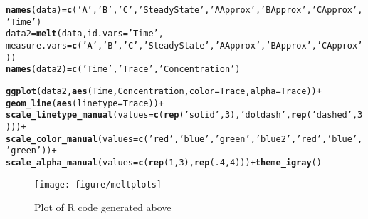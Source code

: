 \documentclass[10pt]{article}\usepackage{graphicx, color}
\makeatletter
\def\maxwidth{ %
  \ifdim\Gin@nat@width>\linewidth
    \linewidth
  \else
    \Gin@nat@width
  \fi
}
\newcommand{\hlfunctioncall}[1]{\textcolor[rgb]{0.501960784313725,0,0.329411764705882}{\textbf{#1}}}%
\newcommand{\hlstring}[1]{\textcolor[rgb]{0.6,0.6,1}{#1}}%
\newenvironment{kframe}{%
 \def\at@end@of@kframe{}%
 \ifinner\ifhmode%
  \def\at@end@of@kframe{\end{minipage}}%
  \begin{minipage}{\columnwidth}%
 \fi\fi%
 \def\FrameCommand##1{\hskip\@totalleftmargin \hskip-\fboxsep
 \colorbox{shadecolor}{##1}\hskip-\fboxsep
     \hskip-\linewidth \hskip-\@totalleftmargin \hskip\columnwidth}%
 \MakeFramed {\advance\hsize-\width
   \@totalleftmargin\z@ \linewidth\hsize
   \@setminipage}}%
 {\par\unskip\endMakeFramed%
 \at@end@of@kframe}
\newenvironment{knitrout}{}{} %
\makeatother
\begin{document}
\begin{knitrout}
\color{fgcolor}\begin{kframe}
\begin{alltt}
\hlfunctioncall{names}(data)=\hlfunctioncall{c}(\hlstring{'A'},\hlstring{'B'},\hlstring{'C'},\hlstring{'Steady State'},\hlstring{'A Approx'},\hlstring{'B Approx'},\hlstring{'C Approx'},\hlstring{'Time'})
data2=\hlfunctioncall{melt}(data,id.vars=\hlstring{'Time'},
           measure.vars=\hlfunctioncall{c}(\hlstring{'A'},\hlstring{'B'},\hlstring{'C'},\hlstring{'Steady State'},\hlstring{'A Approx'},\hlstring{'B Approx'},\hlstring{'C Approx'}))
\hlfunctioncall{names}(data2)=\hlfunctioncall{c}(\hlstring{'Time'},\hlstring{'Trace'},\hlstring{'Concentration'})
\end{alltt}
\end{kframe}
\end{knitrout}



\begin{knitrout}
\color{fgcolor}\begin{kframe}
\begin{alltt}
\hlfunctioncall{ggplot}(data2,\hlfunctioncall{aes}(Time,Concentration,color=Trace,alpha=Trace))+
  \hlfunctioncall{geom_line}(\hlfunctioncall{aes}(linetype=Trace))+
  \hlfunctioncall{scale_linetype_manual}(values=\hlfunctioncall{c}(\hlfunctioncall{rep}(\hlstring{'solid'},3),\hlstring{'dotdash'},\hlfunctioncall{rep}(\hlstring{'dashed'},3)))+
  \hlfunctioncall{scale_color_manual}(values=\hlfunctioncall{c}(\hlstring{'red'},\hlstring{'blue'},\hlstring{'green'},\hlstring{'blue2'},\hlstring{'red'},\hlstring{'blue'},\hlstring{'green'}))+
  \hlfunctioncall{scale_alpha_manual}(values=\hlfunctioncall{c}(\hlfunctioncall{rep}(1,3),\hlfunctioncall{rep}(.4,4)))+\hlfunctioncall{theme_igray}()
\end{alltt}
\end{kframe}\begin{figure}[]

\texttt{[image: figure/meltplots]} \caption[Plot of R code generated above]{Plot of R code generated above\label{fig:meltplots}}
\end{figure}


\end{knitrout}
\end{document}
